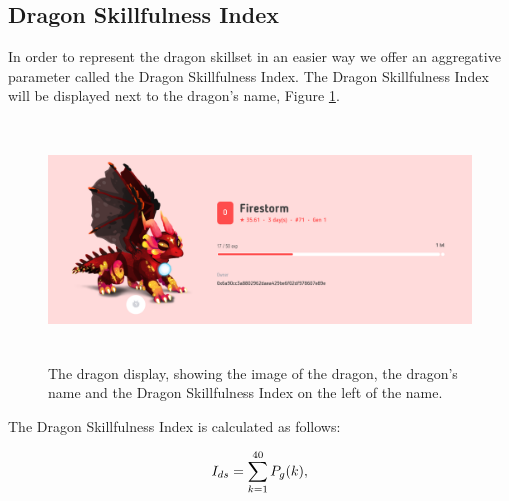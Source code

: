 \documentclass[12pt]{article}
\begin{document}
{\subsection{Dragon Skillfulness Index}
\label{Dragon Skillfulness Index}  \par

In order to represent the dragon skillset in an easier way we offer an aggregative parameter called the Dragon Skillfulness Index. The Dragon Skillfulness Index will be displayed next to the dragon’s name, Figure \ref{fig:The_dragon_display_showing_the_image_of_the_dragon_the_dragons_name_and_the_Dragon_Skillfulness_Index_on_the_left_of_the_name}.\par




\begin{figure}[!ht]
	\begin{FlushLeft}		\includegraphics[width=6.27in,height=2.49in]{./media/image21.png}
		\caption{The dragon display, showing the image of the dragon, the dragon's name and the Dragon Skillfulness Index on the left of the name.}
		\label{fig:The_dragon_display_showing_the_image_of_the_dragon_the_dragons_name_and_the_Dragon_Skillfulness_Index_on_the_left_of_the_name}
	\end{FlushLeft}\end{figure}




\par

The Dragon Skillfulness Index is calculated as follows:\par

\setlength{\parskip}{0.0pt}
\begin{center}
  \begin{equation} \label{Eq:I_{ds}}
      I_{ds}=\sum_{k=1}^{40} P_g(k),
  \end{equation}
\end{center} \par

}
\end{document}

